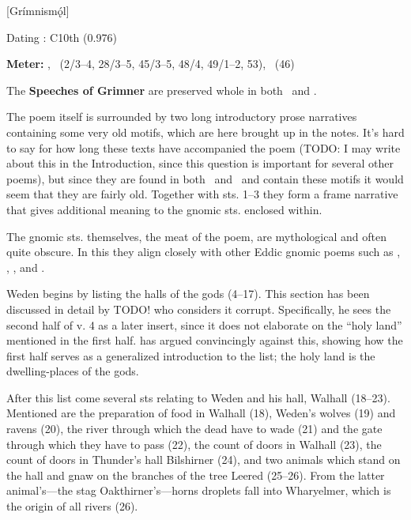 [Grímnismǫ́l]

\begin{flushright}%
Dating \parencite{Sapp2022}: C10th (0.976)

\textbf{Meter: }\Ljodahattr, \Fornyrdislag\ (2/3–4, 28/3–5, 45/3–5, 48/4, 49/1–2, 53), \Galdralag\ (46)%
\end{flushright}


The \textbf{Speeches of Grimner} are preserved whole in both \Regius\ and \AM.

The poem itself is surrounded by two long introductory prose narratives containing some very old motifs, which are here brought up in the notes. It’s hard to say for how long these texts have accompanied the poem (TODO: I may write about this in the Introduction, since this question is important for several other poems), but since they are found in both \Regius\ and \AM\ and contain these motifs it would seem that they are fairly old. Together with sts. 1–3 they form a frame narrative that gives additional meaning to the gnomic sts. enclosed within.

The gnomic sts. themselves, the meat of the poem, are mythological and often quite obscure. In this they align closely with other Eddic gnomic poems such as \Havamal, \Vafthrudnismal, \Sigrdrifumal, and \Allvismal.

Weden begins by listing the halls of the gods (4–17). This section has been discussed in detail by \textcite{deVries1952} TODO! who considers it corrupt. Specifically, he sees the second half of v. 4 as a later insert, since it does not elaborate on the “holy land” mentioned in the first half. \textcite{Jackson1995} has argued convincingly against this, showing how the first half serves as a generalized introduction to the list; the holy land is the dwelling-places of the gods.

After this list come several sts relating to Weden and his hall, Walhall (18–23). Mentioned are the preparation of food in Walhall (18), Weden’s wolves (19) and ravens (20), the river through which the dead have to wade (21) and the gate through which they have to pass (22), the count of doors in Walhall (23), the count of doors in Thunder’s hall Bilshirner (24), and two animals which stand on the hall and gnaw on the branches of the tree Leered (25–26). From the latter animal’s—the stag Oakthirner’s—horns droplets fall into Wharyelmer, which is the origin of all rivers (26).

